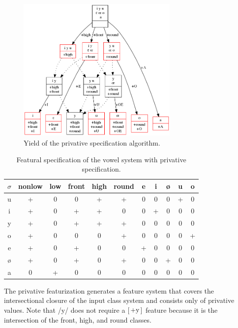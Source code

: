 \documentclass[12pt, oneside]{article}   	%
\newcommand{\featmat}[1]
{$\begin{bsmallmatrix*}[l]\text{\normalsize #1}\end{bsmallmatrix*}$}
\begin{document}
\begin{figure}[htb!]
	\centering
	\includegraphics[width=0.7\textwidth]{vowel_inventory_privative.png}
	\caption{Yield of the privative specification algorithm.}
	\label{fig:privative}
\end{figure}

\begin{table}[htb!]
	\centering
	\begin{tabular} {|c||c|c|c|c|c|c|c|c|c|c|}
		\hline
		$\sigma$ & nonlow & low & front & high & round & e & i & \o & u & o \\ \hline
		u & + & 0 & 0 & + & + & 0 & 0 & 0 & + & 0 \\
		i & + & 0 & + & + & 0 & 0 & + & 0 & 0 & 0 \\
		y & + & 0 & + & + & + & 0 & 0 & 0 & 0 & 0 \\
		o & + & 0 & 0 & 0 & + & 0 & 0 & 0 & 0 & + \\
		e & + & 0 & + & 0 & 0 & + & 0 & 0 & 0 & 0 \\
		\o & + & 0 & + & 0 & + & 0 & 0 & + & 0 & 0 \\
		a & 0 & + & 0 & 0 & 0 & 0 & 0 & 0 & 0 & 0 \\
		\hline
	\end{tabular}
	\caption{Featural specification of the vowel system with privative specification.}
	\label{table:privative_vowel_features}
\end{table}

The privative featurization generates a feature system that covers the intersectional closure of the input class system and consists only of privative values. Note that /y/ does not require a \featmat{+y} feature because it is the intersection of the front, high, and round classes.
\end{document}
